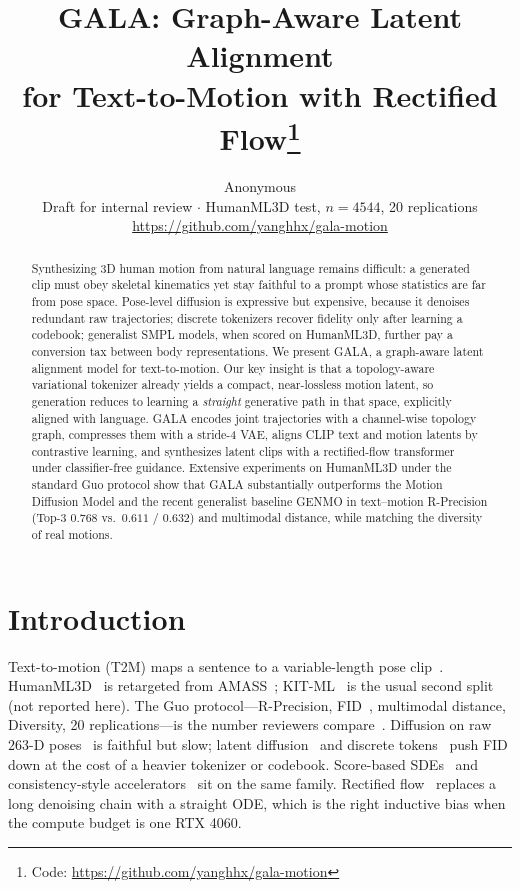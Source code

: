 \documentclass[10pt,twocolumn]{article}
\title{\vspace{-1.2em}GALA: Graph-Aware Latent Alignment\\for Text-to-Motion with Rectified Flow\thanks{Code: \url{https://github.com/yanghhx/gala-motion}}}
\author{Anonymous\\
\small Draft for internal review \quad $\cdot$ \quad HumanML3D test, $n{=}4544$, 20 replications\\
\small \url{https://github.com/yanghhx/gala-motion}}
\date{}
\begin{document}
\maketitle
\vspace{-1.4em}

\begin{abstract}
\vspace{-0.3em}
Synthesizing 3D human motion from natural language remains difficult: a generated clip must obey skeletal kinematics yet stay faithful to a prompt whose statistics are far from pose space.
Pose-level diffusion is expressive but expensive, because it denoises redundant raw trajectories; discrete tokenizers recover fidelity only after learning a codebook; generalist SMPL models, when scored on HumanML3D, further pay a conversion tax between body representations.
We present GALA, a graph-aware latent alignment model for text-to-motion.
Our key insight is that a topology-aware variational tokenizer already yields a compact, near-lossless motion latent, so generation reduces to learning a \emph{straight} generative path in that space, explicitly aligned with language.
GALA encodes joint trajectories with a channel-wise topology graph, compresses them with a stride-4 VAE, aligns CLIP text and motion latents by contrastive learning, and synthesizes latent clips with a rectified-flow transformer under classifier-free guidance.
Extensive experiments on HumanML3D under the standard Guo protocol show that GALA substantially outperforms the Motion Diffusion Model and the recent generalist baseline GENMO in text--motion R-Precision (Top-3 $0.768$ vs.\ $0.611$ / $0.632$) and multimodal distance, while matching the diversity of real motions.
\vspace{-0.4em}
\end{abstract}

\section{Introduction}

Text-to-motion (T2M) maps a sentence to a variable-length pose clip~\cite{guo2022humanml3d,tevet2023mdm}.
HumanML3D~\cite{guo2022humanml3d} is retargeted from AMASS~\cite{mahmood2019amass}; KIT-ML~\cite{plappert2016kit} is the usual second split (not reported here).
The Guo protocol---R-Precision, FID~\cite{heusel2017fid}, multimodal distance, Diversity, 20 replications---is the number reviewers compare~\cite{guo2022humanml3d,tevet2023mdm}.
Diffusion on raw $263$-D poses~\cite{tevet2023mdm,zhang2022motiondiffuse} is faithful but slow; latent diffusion~\cite{chen2023mld} and discrete tokens~\cite{zhang2023t2mgpt,guo2024momask,kong2023m2dm} push FID down at the cost of a heavier tokenizer or codebook.
Score-based SDEs~\cite{song2021score} and consistency-style accelerators~\cite{dai2024motionlcm} sit on the same family.
Rectified flow~\cite{liu2023rectified,lipman2023flow} replaces a long denoising chain with a straight ODE, which is the right inductive bias when the compute budget is one RTX 4060.
\end{document}
